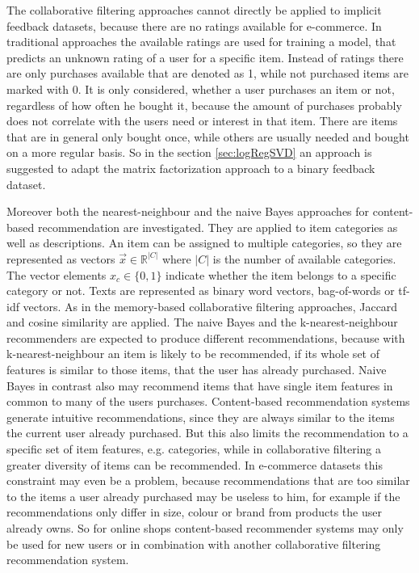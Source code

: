 \documentclass[10pt]{reportMaster}
\begin{document}
The collaborative filtering approaches cannot directly be applied to implicit feedback datasets, because there are no ratings available for e-commerce.
In traditional approaches the available ratings are used for training a model, that predicts an unknown rating of a user for a specific item.
Instead of ratings there are only purchases available that are denoted as 1, while not purchased items are marked with 0.
It is only considered, whether a user purchases an item or not, regardless of how often he bought it, because the amount of purchases probably does not correlate with the users need or interest in that item.
There are items that are in general only bought once, while others are usually needed and bought on a more regular basis. 
So in the section \ref{sec:logRegSVD} an approach is suggested to adapt the matrix factorization approach to a binary feedback dataset.

Moreover both the nearest-neighbour and the naive Bayes approaches for content-based recommendation are investigated.
They are applied to item categories as well as descriptions.
An item can be assigned to multiple categories, so they are represented as vectors $\vec{x} \in \mathds{R}^{|C|}$ where $|C|$ is the number of available categories.
The vector elements $x_c \in \{0,1\}$ indicate whether the item belongs to a specific category or not. 
Texts are represented as binary word vectors, bag-of-words or tf-idf vectors.
As in the memory-based collaborative filtering approaches, Jaccard and cosine similarity are applied.
The naive Bayes and the k-nearest-neighbour recommenders are expected to produce different recommendations, because with k-nearest-neighbour an item is likely to be recommended, if its whole set of features is similar to those items, that the user has already purchased.
Naive Bayes in contrast also may recommend items that have single item features in common to many of the users purchases.
Content-based recommendation systems generate intuitive recommendations, since they are always similar to the items the current user already purchased.
But this also limits the recommendation to a specific set of item features, e.g. categories, while in collaborative filtering a greater diversity of items can be recommended.
In e-commerce datasets this constraint may even be a problem, because recommendations that are too similar to the items a user already purchased may be useless to him, for example if the recommendations only differ in size, colour or brand from products the user already owns.
So for online shops content-based recommender systems may only be used for new users or in combination with another collaborative filtering recommendation system. %
\end{document}
